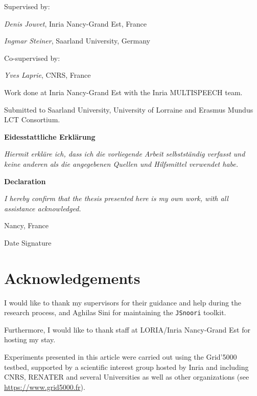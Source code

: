 \thispagestyle{empty}

Supervised by:

\textit{Denis Jouvet}, Inria Nancy-Grand Est, France

\textit{Ingmar Steiner}, Saarland University, Germany

\bigskip

Co-supervised by:

\textit{Yves Laprie}, CNRS, France

\bigskip

Work done at Inria Nancy-Grand Est with the Inria MULTISPEECH team.

\medskip

Submitted to Saarland University, University of Lorraine and Erasmus Mundus LCT Consortium.


\vfill

\noindent \textbf{Eidesstattliche Erklärung}

\smallskip

\textit{Hiermit erkläre ich, dass ich die vorliegende Arbeit selbstständig verfasst und keine anderen als die angegebenen Quellen und Hilfsmittel verwendet habe.}

\medskip

\noindent \textbf{Declaration}

\smallskip

\textit{I hereby confirm that the thesis presented here is my own work, with all assistance acknowledged.}

\bigskip

\noindent Nancy, France

\bigskip

\noindent Date \hspace{3cm} Signature

\newpage

\thispagestyle{empty}

\section*{Acknowledgements}

I would like to thank my supervisors for their guidance and help during the research process, and Aghilas Sini for maintaining the \texttt{JSnoori} toolkit.

Furthermore, I would like to thank staff at LORIA/Inria Nancy-Grand Est for hosting my stay.

\bigskip

Experiments presented in this article were carried out using the
Grid'5000 testbed, supported by a scientific interest group hosted by
Inria and including CNRS, RENATER and several Universities as well as
other organizations (see \url{https://www.grid5000.fr}).
